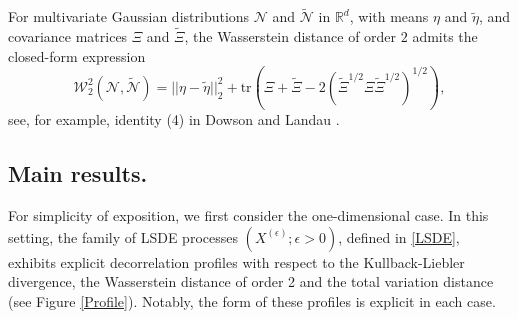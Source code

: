 \documentclass[12pt,thmsa]{article}
\begin{document}
For multivariate Gaussian distributions $\mathcal{N}$ and $\widetilde{\mathcal{N}}$ in $\mathbb{R}^d$,  with  means $\eta$ and $\widetilde{\eta}$, and covariance matrices $\Xi$ and $\widetilde{\Xi}$, 
the Wasserstein distance of order $2$ admits the closed-form expression
\begin{equation}\label{W2gau}
\mathcal{W}_2^2(\mathcal{N},\widetilde{\mathcal{N}})=|| \eta -\widetilde{\eta}||_2^2+\mathrm{tr}\left(\Xi+\widetilde{\Xi}-2\left(\widetilde{\Xi}^{1/2}\Xi\widetilde{\Xi}^{1/2}\right)^{1/2}\right),
\end{equation}
see,  for example,  identity (4) in Dowson and Landau \cite{DL}. 
\subsection{Main results.}
For simplicity of exposition, we first consider the one-dimensional case.  In this setting,  the  family of LSDE processes $(X^{(\epsilon)}; \epsilon>0)$, defined in \eqref{LSDE}, exhibits explicit decorrelation profiles with respect to the  Kullback-Liebler divergence, the Wasserstein distance of order 2 and the total variation distance (see Figure \ref{Profile}). Notably, the form of these profiles 
is  explicit in each case.
\end{document}
